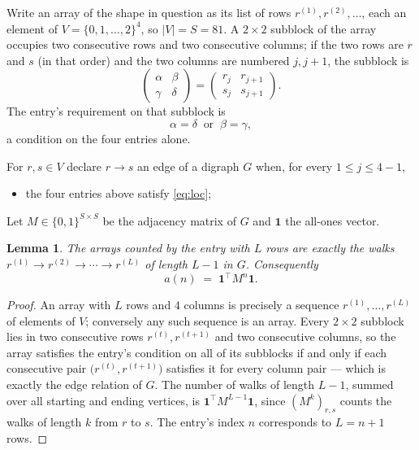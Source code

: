 \documentclass[11pt,a4paper]{article}
\theoremstyle{plain}
\newtheorem{lemma}[theorem]{Lemma}
\theoremstyle{definition}
\begin{document}
Write an array of the shape in question as its list of rows
$r^{(1)},r^{(2)},\dots$, each an element of
$V=\{0,1,\dots,2\}^{4}$, so $|V|=S=81$. A $2\times2$ subblock of the array
occupies two consecutive rows and two consecutive columns; if the two rows are $r$
and $s$ (in that order) and the two columns are numbered $j,j+1$,
the subblock is
\[
\begin{pmatrix}\alpha&\beta\\\gamma&\delta\end{pmatrix}=\begin{pmatrix}r_j&r_{j+1}\\s_j&s_{j+1}\end{pmatrix}.
\]
The entry's requirement on that subblock is
\begin{equation}\label{eq:loc}
\alpha=\delta\ \text{ or }\ \beta=\gamma,
\end{equation}
a condition on the four entries alone.

For $r,s\in V$ declare $r\to s$ an edge of a digraph $G$ when, for every
$1\le j\le 4-1$,
\begin{itemize}
\item the four entries above satisfy \eqref{eq:loc};

\end{itemize}
Let $M\in\{0,1\}^{S\times S}$ be the adjacency matrix of $G$ and $\mathbf{1}$ the
all-ones vector.

\begin{lemma}\label{lem:walk}
The arrays counted by the entry with $L$ rows are exactly the walks
$r^{(1)}\to r^{(2)}\to\cdots\to r^{(L)}$ of length $L-1$ in $G$. Consequently
\[
a(n)\;=\;\mathbf{1}^{\!\top}M^{n}\mathbf{1} .
\]
\end{lemma}

\begin{proof}
An array with $L$ rows and $4$ columns is precisely a sequence
$r^{(1)},\dots,r^{(L)}$ of elements of $V$; conversely any such sequence is an array.
Every $2\times2$ subblock lies in two consecutive rows $r^{(t)},r^{(t+1)}$ and two
consecutive columns, so the array satisfies the entry's condition on all of its subblocks
if and only if each consecutive pair $\bigl(r^{(t)},r^{(t+1)}\bigr)$ satisfies it for
every column pair --- which is exactly the edge relation of $G$. The number of walks of
length $L-1$, summed over all starting and ending vertices, is
$\mathbf{1}^{\!\top}M^{L-1}\mathbf{1}$, since $(M^{k})_{r,s}$ counts the walks of
length $k$ from $r$ to $s$. The entry's index $n$ corresponds to $L=n+1$ rows.
\end{proof}
\end{document}
